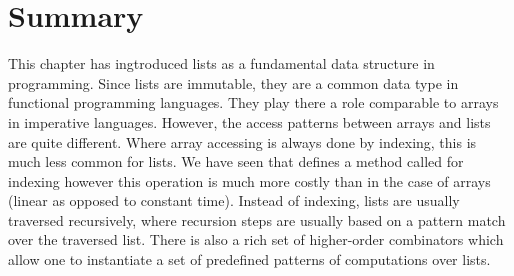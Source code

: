 \section{Summary}

This chapter has ingtroduced lists as a fundamental data structure in
programming. Since lists are immutable, they are a common data type in
functional programming languages. They play there a role comparable to
arrays in imperative languages. However, the access patterns between
arrays and lists are quite different. Where array accessing is always
done by indexing, this is much less common for lists.  We have seen
that  defines a method called  for indexing
however this operation is much more costly than in the case of arrays
(linear as opposed to constant time). Instead of indexing, lists are
usually traversed recursively, where recursion steps are usually based
on a pattern match over the traversed list. There is also a rich set of
higher-order combinators which allow one to instantiate a set of
predefined patterns of computations over lists.

